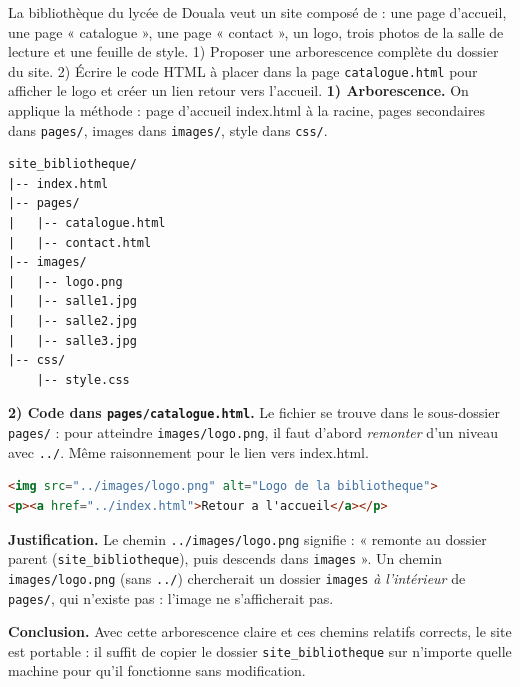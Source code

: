 \documentclass[11pt]{article}
\newcommand{\cle}[1]{{\popxbold\color{popdark}#1}}
\newcounter{popsec}
\newcounter{popsub}
\newcommand{\courssub}[1]{%
  \stepcounter{popsub}%
  \par\vspace{9pt}\noindent{\popxbold\fontsize{11.5}{13}\selectfont\color{popink}{\color{poporange}\thepopsec.\thepopsub}\hspace{6pt}#1}\par\nopagebreak\vspace{4pt}
}
\begin{document}
\begin{exoresolu}
La bibliothèque du lycée de Douala veut un site composé de : une page d'accueil, une page « catalogue », une page « contact », un logo, trois photos de la salle de lecture et une feuille de style. 1) Proposer une arborescence complète du dossier du site. 2) Écrire le code HTML à placer dans la page \texttt{catalogue.html} pour afficher le logo et créer un lien retour vers l'accueil.
\tcblower
\textbf{1) Arborescence.} On applique la méthode : page d'accueil \cle{index.html} à la racine, pages secondaires dans \texttt{pages/}, images dans \texttt{images/}, style dans \texttt{css/}.
\begin{lstlisting}
site_bibliotheque/
|-- index.html
|-- pages/
|   |-- catalogue.html
|   |-- contact.html
|-- images/
|   |-- logo.png
|   |-- salle1.jpg
|   |-- salle2.jpg
|   |-- salle3.jpg
|-- css/
    |-- style.css
\end{lstlisting}
\textbf{2) Code dans \texttt{pages/catalogue.html}.} Le fichier se trouve dans le sous-dossier \texttt{pages/} : pour atteindre \texttt{images/logo.png}, il faut d'abord \emph{remonter} d'un niveau avec \texttt{../}. Même raisonnement pour le lien vers \cle{index.html}.
\begin{lstlisting}[language=HTML]
<img src="../images/logo.png" alt="Logo de la bibliotheque">
<p><a href="../index.html">Retour a l'accueil</a></p>
\end{lstlisting}
\textbf{Justification.} Le chemin \texttt{../images/logo.png} signifie : « remonte au dossier parent (\texttt{site\_bibliotheque}), puis descends dans \texttt{images} ». Un chemin \texttt{images/logo.png} (sans \texttt{../}) chercherait un dossier \texttt{images} \emph{à l'intérieur} de \texttt{pages/}, qui n'existe pas : l'image ne s'afficherait pas.

\textbf{Conclusion.} Avec cette arborescence claire et ces chemins relatifs corrects, le site est portable : il suffit de copier le dossier \texttt{site\_bibliotheque} sur n'importe quelle machine pour qu'il fonctionne sans modification.
\end{exoresolu}

\courssub{Contribution du CSS}
\end{document}
